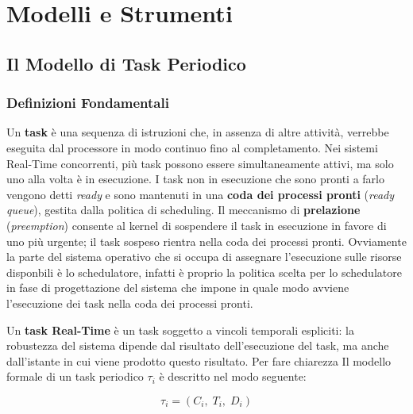 \chapter{Modelli e Strumenti}
\label{ch:modelli_strumenti}

\section{Il Modello di Task Periodico}
\label{sec:task_periodico}

\subsection{Definizioni Fondamentali}

Un \textbf{task} è una sequenza di istruzioni che, in assenza di altre attività, verrebbe eseguita dal processore in modo continuo fino al completamento. Nei sistemi Real-Time concorrenti, più task possono essere simultaneamente attivi, ma solo uno alla volta è in esecuzione. I task non in esecuzione che sono pronti a farlo vengono detti \textit{ready} e sono mantenuti in una \textbf{coda dei processi pronti} (\textit{ready queue}), gestita dalla politica di scheduling. Il meccanismo di \textbf{prelazione} (\textit{preemption}) consente al kernel di sospendere il task in esecuzione in favore di uno più urgente; il task sospeso rientra nella coda dei processi pronti. Ovviamente la parte del sistema operativo che si occupa di assegnare l'esecuzione sulle risorse disponbili è lo schedulatore, infatti  è proprio la politica scelta per lo schedulatore in fase di progettazione del sistema che impone in quale modo avviene l'esecuzione dei task nella coda dei processi pronti.

Un \textbf{task Real-Time} è un task soggetto a vincoli temporali espliciti: la robustezza del sistema dipende dal risultato dell'esecuzione del task, ma anche dall'istante in cui viene prodotto questo risultato. Per fare chiarezza Il modello formale di un task periodico $\tau_i$ è descritto nel modo seguente:

\begin{equation}
	\tau_i = (C_i,\; T_i,\; D_i)
\end{equation}


